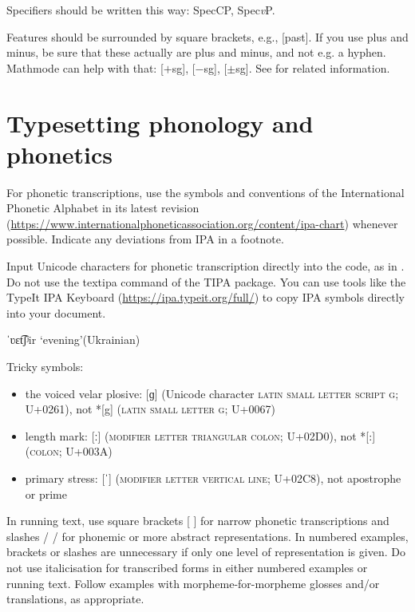 Specifiers should be written this way: SpecCP, Spec\textit{v}P.

Features should be surrounded by square brackets, e.g., [past]. If you use plus and minus, be sure that these actually are plus and minus, and not e.g. a hyphen. Mathmode can help with that: [$+$sg], [$-$sg], [$\pm$sg]. See  for related information.

\section{Typesetting phonology and phonetics}\label{sim:sec:phonology-and-phonetics}

For phonetic transcriptions, use the symbols and conventions of the International Phonetic Alphabet in its latest revision (\url{https://www.internationalphoneticassociation.org/content/ipa-chart}) whenever possible. Indicate any deviations from IPA in a footnote. 

Input Unicode characters for phonetic transcription directly into the code, as in . Do not use the textipa command of the TIPA package. You can use tools like the TypeIt IPA Keyboard (\url{https://ipa.typeit.org/full/}) to copy IPA symbols directly into your document.

\ea\label{sim:ex:IPA-ukrainian} ˈʋɛt͡ʃʲir `evening'\hfill (Ukrainian)
\z

\noindent Tricky symbols:

\begin{itemize}
\item the voiced velar plosive: [ɡ] (Unicode character \textsc{latin small letter script g}; U+0261), not *[g] (\textsc{latin small letter g}; U+0067)
\item length mark: [ː] (\textsc{modifier letter triangular colon}; U+02D0), not *[:] (\textsc{colon}; U+003A)
\item primary stress: [ˈ] (\textsc{modifier letter vertical line}; U+02C8), not apostrophe or prime
\end{itemize}


\noindent In running text, use square brackets [ ] for narrow phonetic transcriptions and slashes / / for phonemic or more abstract representations. In numbered examples, brackets or slashes are unnecessary if only one level of representation is given. Do not use italicisation for transcribed forms in either numbered examples or running text. Follow examples with morpheme-for-morpheme glosses and/or translations, as appropriate. 

